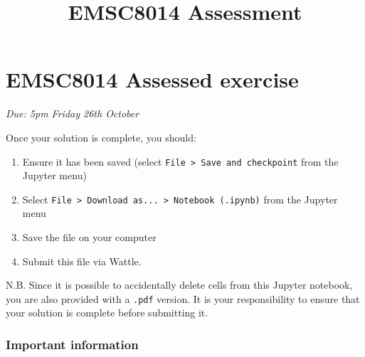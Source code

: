 \documentclass[11pt]{article}
\title{EMSC8014 Assessment}
\providecommand{\tightlist}{%
      \setlength{\itemsep}{0pt}\setlength{\parskip}{0pt}}
\begin{document}
    
    
    \maketitle
    
    

    
    \hypertarget{emsc8014-assessed-exercise}{%
\section*{EMSC8014 Assessed exercise}\label{emsc8014-assessed-exercise}}

\emph{Due: 5pm Friday 26th October}

Once your solution is complete, you should:

\begin{enumerate}
\def\labelenumi{\arabic{enumi}.}
\tightlist
\item
  Ensure it has been saved (select
  \texttt{File\ \textgreater{}\ Save\ and\ checkpoint} from the Jupyter
  menu)
\item
  Select
  \texttt{File\ \textgreater{}\ Download\ as...\ \textgreater{}\ Notebook\ (.ipynb)}
  from the Jupyter menu
\item
  Save the file on your computer
\item
  Submit this file via Wattle.
\end{enumerate}

N.B. Since it is possible to accidentally delete cells from this Jupyter
notebook, you are also provided with a \texttt{.pdf} version. It is your
responsibility to ensure that your solution is complete before
submitting it.

\hypertarget{important-information}{%
\subsubsection*{Important information}\label{important-information}}
\end{document}
